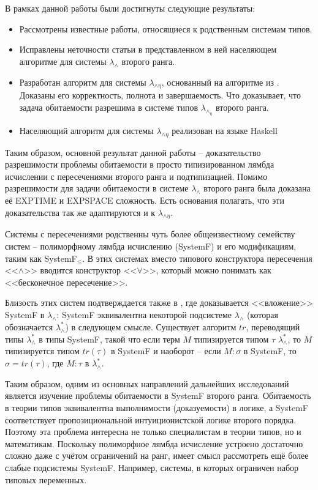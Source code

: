 \documentclass[../main.tex]{subfiles}
\begin{document}
В рамках данной работы были достигнуты следующие результаты: 

\begin{itemize}
    \item  Рассмотрены известные работы, относящиеся к родственным системам типов. 
    \item  Исправлены неточности статьи \cite{kusmierek_2007} в представленном в ней населяющем алгоритме для системы $\lambda_\wedge$ второго ранга. 
    \item  Разработан алгоритм для системы $\lambda_{\wedge \eta}$, основанный на алгоритме из \cite{kusmierek_2007}. Доказаны его корректность, полнота и завершаемость. Что доказывает, что задача обитаемости разрешима в системе типов $\lambda_\wedge_\eta$ второго ранга. 
    \item  Населяющий алгоритм для системы $\lambda_{\wedge \eta}$ реализован на языке Haskell \cite{kaysin_2019} 
\end{itemize}

Таким образом, основной результат данной работы -- доказательство разрешимости проблемы обитаемости в просто типизированном лямбда исчислении с пересечениями второго ранга и подтипизацией. Помимо разрешимости для задачи обитаемости в системе $\lambda_\wedge$ второго ранга была доказана её EXPTIME и EXPSPACE сложность. Есть основания полагать, что эти доказательства так же адаптируются и к $\lambda_{\wedge \eta}$. 

\emptyline

Системы с пересечениями родственны чуть более общеизвестному семейству систем -- полиморфному лямбда исчислению (SystemF) и его модификациям, таким как SystemF$_\leqslant$. В этих системах вместо типового конструктора пересечения <<$\wedge$>> вводится конструктор <<$\forall$>>, который можно понимать как <<бесконечное пересечение>>. 

Близость этих систем подтверждается также в \cite{yokouchi_1995}, где доказывается <<вложение>> SystemF в $\lambda_\wedge$: SystemF эквивалентна некоторой подсистеме $\lambda_\wedge$ (которая обозначается $\lambda_\wedge^*$) в следующем смысле. Существует алгоритм $tr$, переводящий типы $\lambda_\wedge^*$ в типы SystemF, такой что если терм $M$ типизируется типом $\tau$ $\lambda_\wedge^*$, то $M$ типизируется типом $tr(\tau)$ в SystemF и наоборот -- если $M \colon \sigma$ в SystemF, то $\sigma = tr(\tau)$, где $M \colon \tau$ в $\lambda_\wedge^*$.

Таким образом, одним из основных направлений дальнейших исследований является изучение проблемы обитаемости в SystemF второго ранга. Обитаемость в теории типов эквивалентна выполнимости (доказуемости) в логике, а SystemF соответствует пропозициональной интуиционистской логике второго порядка. Поэтому эта проблема интересна не только специалистам в теории типов, но и математикам. Поскольку полиморфное лямбда исчисление устроено достаточно сложно даже с учётом ограничений на ранг, имеет смысл рассмотреть ещё более слабые подсистемы SystemF. Например, системы, в которых ограничен набор типовых переменных.
\end{document}
